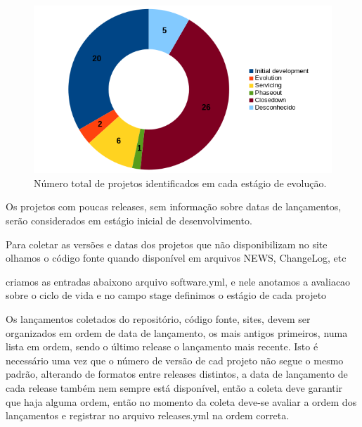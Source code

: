 \begin{figure}[h]
  \begin{minipage}{0.5\textwidth}
    \centering
    \includegraphics[scale=0.55]{imagens/life-cycle-pie.png}
  \end{minipage}
  \begin{minipage}{0.5\textwidth}
    \centering
    
  \end{minipage}
  \caption{Número total de projetos identificados em cada estágio de evolução.}
  \label{life-cycle}
\end{figure}

Os projetos com poucas releases, sem informação sobre datas de lançamentos, serão
considerados em estágio inicial de desenvolvimento.

Para coletar as versões e datas dos projetos que não disponibilizam no site olhamos
o código fonte quando disponível em arquivos NEWS, ChangeLog, etc

criamos as entradas abaixono arquivo software.yml, e nele anotamos
a avaliacao sobre o ciclo de vida e no campo stage definimos o estágio
de cada projeto




Os lançamentos coletados do repositório, código fonte, sites, devem ser organizados
em ordem de data de lançamento, os mais antigos primeiros, numa lista em ordem, sendo
o último release o lançamento mais recente. Isto é necessário uma vez que o número de versão
de cad projeto não segue o mesmo padrão, alterando de formatos entre releases distintos,
a data de lançamento de cada release também nem sempre está disponível, então
a coleta deve garantir que haja alguma ordem, então no momento da coleta deve-se
avaliar a ordem dos lançamentos e registrar no arquivo releases.yml na ordem correta.

